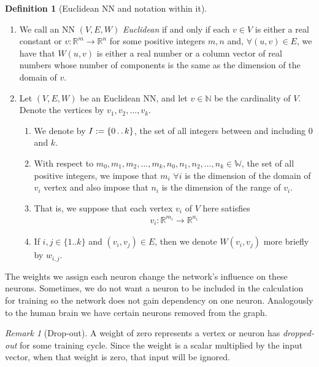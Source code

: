 \documentclass[12pt]{amsart}
\newcommand{\RR}{{\mathbb R}}
\newcommand{\twodots}{\mathinner {\ldotp \ldotp}}
\theoremstyle{definition}
\newtheorem{definition}[theorem]{Definition}
\theoremstyle{remark}
\newtheorem{remark}[theorem]{Remark}
\begin{document}
\begin{definition}[Euclidean NN and notation within it]
    \leavevmode
    \begin{enumerate}
        \item We call an NN $(V,E,W)$ {\em Euclidean} if and only if each $v\in V$ is either
        a real constant or $v:\RR^m\rightarrow\RR^n$ for some positive integers 
        $m,n$ and, $\forall (u,v)\in E$, we have that $W(u,v)$ is either a real 
        number or a column vector of real numbers whose number of components is 
        the same as the dimension of the domain of $v$. 
        
        \item Let $(V,E,W)$ be an Euclidean NN, and let $v\in\mathbb{N}$ be the 
        cardinality of $V$. Denote the vertices by $v_1,v_2,\ldots, v_k$. 
        \begin{enumerate}
                \item We denote by $I:=\{0\twodots k\}$, the set of all integers
                    between and including $0$ and $k$. 
                \item With respect to $m_0,m_1, m_2, \dots, m_k, n_0, n_1, n_2, 
                    \dots, n_k \in \mathbb{W}$, the set of all positive integers, we impose that 
                    $m_i$ $\forall i$ is the dimension of the domain of $v_i$ vertex 
                    and also impose that $n_i$ is the dimension of the range of $v_i$.
                \item That is, we suppose that each vertex $v_i$ of $V$ here satisfies
                    \begin{align*}
                        v_i:\mathbb{R}^{m_i} \to \mathbb{R}^{n_i} 
                    \end{align*}
                \item If $i,j\in \{1..k\}$ and $(v_i,v_j)\in E$, then we denote 
                    $W(v_i,v_j)$ more briefly by $w_{i,j}$.
        \end{enumerate}
    \end{enumerate}
\end{definition}

The weights we assign each neuron change the network's influence on these neurons.
Sometimes, we do not want a neuron to be included in the calculation for training
so the network does not gain dependency on one neuron. Analogously to the human 
brain we have certain neurons removed from the graph.

\begin{remark}[Drop-out]
        A weight of zero represents a vertex or neuron has {\em dropped-out} for
        some training cycle. Since the weight is a scalar multiplied by the input
        vector, when that weight is zero, that input will be ignored.
\end{remark}
\end{document}
